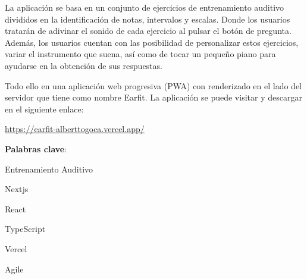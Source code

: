 \documentclass[12pt,twoside,titlepage]{report}
\newcommand\blankpage{%
    \newpage
    \null
    \thispagestyle{empty}%
    \newpage}
\begin{document}
La aplicación se basa en un conjunto de ejercicios de entrenamiento auditivo divididos en la identificación de notas, intervalos y escalas. Donde los usuarios tratarán de adivinar el sonido de cada ejercicio al pulsar el botón de pregunta. Además, los usuarios cuentan con las posibilidad de personalizar estos ejercicios, variar el instrumento que suena, así como de tocar un pequeño piano para ayudarse en la obtención de sus respuestas.

Todo ello en una aplicación web progresiva (PWA) con renderizado en el lado del servidor que tiene como nombre Earfit. La aplicación se puede visitar y descargar en el siguiente enlace:

\url{https://earfit-alberttogoca.vercel.app/}

\mbox{} \bigskip

\noindent \textbf{Palabras clave}:
\begin{compactitem}
    \item Entrenamiento Auditivo
    \item Nextjs
    \item React
    \item TypeScript
    \item Vercel
    \item Agile
\end{compactitem}

\afterpage{\blankpage}


 

\setlength{\parskip}{1pt}
\renewcommand{\baselinestretch}{1}
\renewcommand{\contentsname}{Índice de contenidos}

\tableofcontents
\afterpage{\blankpage}

\listoffigures
\afterpage{\blankpage}


\end{document}
